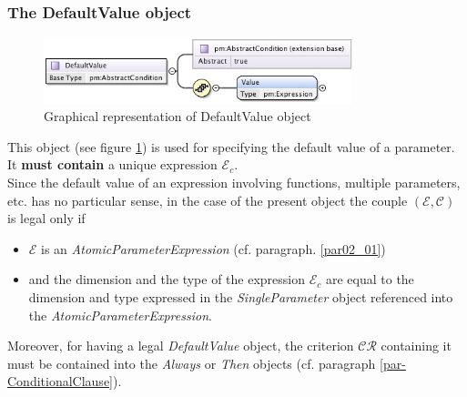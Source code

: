 \documentclass[a4paper,11pt] {article}
\begin{document}
\subsubsection{The DefaultValue object}\label{par-DefaultValue}
\begin{figure}[htbp]
\begin{center}
\includegraphics[width=0.8\textwidth]{pictures/DefaultValue.jpg} 
\caption{Graphical representation of DefaultValue object}
\label{Pic-DefaultValue}
\end{center}
\end{figure}
This object (see figure \ref{Pic-DefaultValue}) is used for specifying the default value of a
parameter.\\
It {\bf must contain} a unique expression $\mathcal E_c$.\\
Since the default value of an expression involving functions, multiple parameters, etc. has no
particular sense, in the case of the present object the couple $(\mathcal E, \mathcal C)$  is legal
only if
\begin{itemize}
\item $\mathcal E$ is an {\it AtomicParameterExpression} (cf. paragraph. \ref{par02_01}) \item and
the dimension and the type of the expression $\mathcal E_c$ are equal to the dimension and type
expressed in the {\it SingleParameter} object referenced into the {\it AtomicParameterExpression}.
\end{itemize}
Moreover, for having a legal {\it DefaultValue} object, the criterion $\mathcal{CR}$ containing it must be contained into 
the {\it Always} or {\it Then}  objects (cf. paragraph \ref{par-ConditionalClause}).
\end{document}
